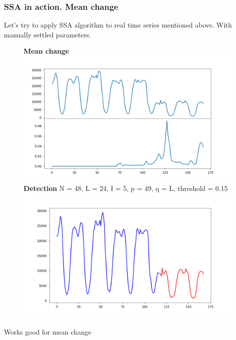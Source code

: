 \documentclass[intlimits, 9pt, unicode]{beamer}
\begin{document}
\begin{frame}
    \frametitle{SSA in action. Mean change}

Let's try to apply SSA algorithm to real time series mentioned above. With manually settled parameters.
\begin{figure}
	\textbf{Mean change}
	\includegraphics[scale=0.10]{images/017_mean_cp}
	\textbf{Detection}
	N = 48, L = 24, I = 5, p = 49, q = L, threshold = 0.15
	\includegraphics[scale=0.10]{images/018_mean_cp_detected}
\end{figure}

Works good for mean change

\end{frame}
\end{document}
